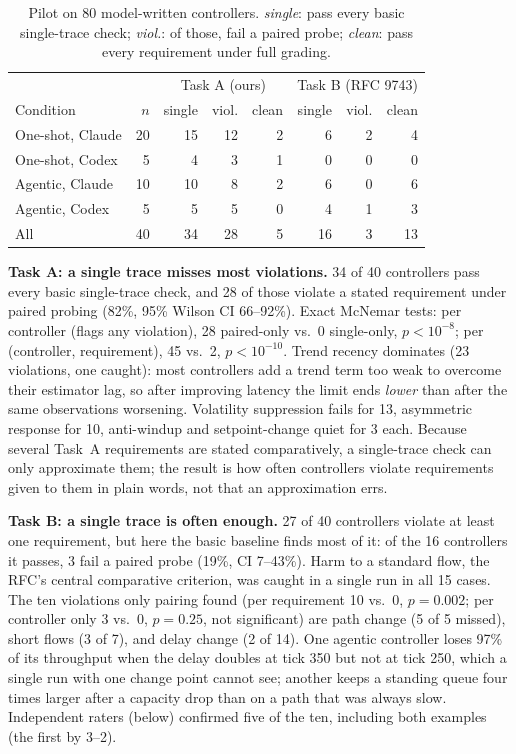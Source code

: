 \documentclass[conference]{IEEEtran}
\begin{document}
	\begin{table}[t]
		\caption{Pilot on 80 model-written controllers. \emph{single}:
			pass every basic single-trace check; \emph{viol.}: of those, fail a
			paired probe; \emph{clean}: pass every requirement under full
			grading.}
		\label{tab:pilot}
		\centering
		\scriptsize
		\begin{tabular}{@{}lrrrrrrr@{}}
			\toprule
			& & \multicolumn{3}{c}{Task A (ours)} & \multicolumn{3}{c}{Task B (RFC 9743)} \\
			Condition & $n$ & single & viol. & clean & single & viol. & clean \\
			\midrule
			One-shot, Claude & 20 & 15 & 12 & 2 &  6 & 2 & 4 \\
			One-shot, Codex  &  5 &  4 &  3 & 1 &  0 & 0 & 0 \\
			Agentic, Claude  & 10 & 10 &  8 & 2 &  6 & 0 & 6 \\
			Agentic, Codex   &  5 &  5 &  5 & 0 &  4 & 1 & 3 \\
			\midrule
			All              & 40 & 34 & 28 & 5 & 16 & 3 & 13 \\
			\bottomrule
		\end{tabular}
	\end{table}
	
	\textbf{Task A: a single trace misses most violations.} 34 of 40
	controllers pass every basic single-trace check, and 28 of those violate
	a stated requirement under paired probing (82\%, 95\% Wilson CI
	66--92\%). Exact McNemar tests: per controller (flags any violation),
	28 paired-only vs.\ 0 single-only, $p<10^{-8}$; per (controller,
	requirement), 45 vs.\ 2, $p<10^{-10}$. Trend recency dominates (23 violations, one
	caught): most controllers add a trend term too weak to overcome their
	estimator lag, so after improving latency the limit ends \emph{lower}
	than after the same observations worsening. Volatility suppression
	fails for 13, asymmetric response for 10, anti-windup and
	setpoint-change quiet for 3 each. Because several Task~A requirements
	are stated comparatively, a single-trace check can only approximate
	them; the result is how often controllers violate requirements given
	to them in plain words, not that an approximation errs.
	
	\textbf{Task B: a single trace is often enough.} 27 of 40 controllers
	violate at least one requirement, but here the basic baseline finds
	most of it: of the 16 controllers it passes, 3 fail a paired probe
	(19\%, CI 7--43\%). Harm to a standard flow, the RFC's central
	comparative criterion, was caught in a single run in all 15 cases. The
	ten violations only pairing found (per requirement 10 vs.\ 0, $p=0.002$;
	per controller only 3 vs.\ 0, $p=0.25$, not significant) are path change (5 of 5 missed), short flows (3 of 7), and delay change
	(2 of 14). One agentic controller loses 97\% of its throughput when the
	delay doubles at tick 350 but not at tick 250, which a single run with
	one change point cannot see; another keeps a standing queue four times
	larger after a capacity drop than on a path that was always slow.
	Independent raters (below) confirmed five of the ten, including both
	examples (the first by 3--2).
	
\end{document}
